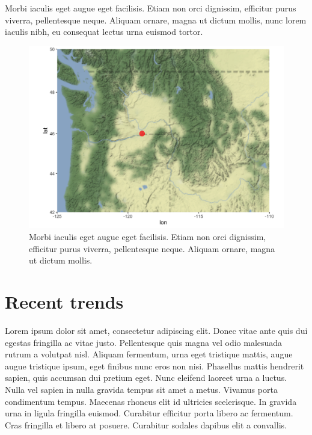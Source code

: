 \documentclass[
  letterpaper,
  oneside,
  open=any]{scrbook}
\begin{document}
Morbi iaculis eget augue eget facilisis. Etiam non orci dignissim,
efficitur purus viverra, pellentesque neque. Aliquam ornare, magna ut
dictum mollis, nunc lorem iaculis nibh, eu consequat lectus urna euismod
tortor.

\begin{figure}

{\centering \includegraphics[width=4.48in,height=\textheight]{text/../images/fig-map.png}

}

\caption{\label{fig-map}Morbi iaculis eget augue eget facilisis. Etiam
non orci dignissim, efficitur purus viverra, pellentesque neque. Aliquam
ornare, magna ut dictum mollis.}

\end{figure}

\hypertarget{recent-trends}{%
\section{Recent trends}\label{recent-trends}}

Lorem ipsum dolor sit amet, consectetur adipiscing elit. Donec vitae
ante quis dui egestas fringilla ac vitae justo. Pellentesque quis magna
vel odio malesuada rutrum a volutpat nisl. Aliquam fermentum, urna eget
tristique mattis, augue augue tristique ipsum, eget finibus nunc eros
non nisi. Phasellus mattis hendrerit sapien, quis accumsan dui pretium
eget. Nunc eleifend laoreet urna a luctus. Nulla vel sapien in nulla
gravida tempus sit amet a metus. Vivamus porta condimentum tempus.
Maecenas rhoncus elit id ultricies scelerisque. In gravida urna in
ligula fringilla euismod. Curabitur efficitur porta libero ac fermentum.
Cras fringilla et libero at posuere. Curabitur sodales dapibus elit a
convallis.
\end{document}
